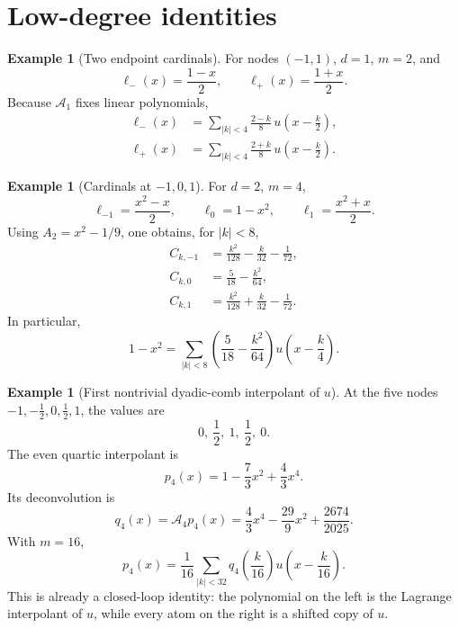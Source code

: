 \documentclass[11pt,oneside]{book}
\theoremstyle{definition}
\newtheorem{example}[theorem]{Example}
\theoremstyle{remark}
\newcommand{\Aop}{\mathcal A}
\begin{document}
\section{Low-degree identities}
\begin{example}[Two endpoint cardinals]
For nodes \((-1,1)\), \(d=1\), \(m=2\), and
\[
 \ell_-(x)=\frac{1-x}{2},\qquad \ell_+(x)=\frac{1+x}{2}.
\]
Because \(\Aop_1\) fixes linear polynomials,
\begin{align}
 \ell_-(x)&=\sum_{|k|<4}\frac{2-k}{8}\,u\!\left(x-\frac k2\right),\label{eq:linear-cardinal-minus}\\
 \ell_+(x)&=\sum_{|k|<4}\frac{2+k}{8}\,u\!\left(x-\frac k2\right).
 \label{eq:linear-cardinal-plus}
\end{align}
\end{example}

\begin{example}[Cardinals at \(-1,0,1\)]
For \(d=2\), \(m=4\),
\[
 \ell_{-1}=\frac{x^2-x}{2},\qquad
 \ell_0=1-x^2,\qquad
 \ell_1=\frac{x^2+x}{2}.
\]
Using \(A_2=x^2-1/9\), one obtains, for \(|k|<8\),
\begin{align}
 C_{k,-1}&=\frac{k^2}{128}-\frac{k}{32}-\frac1{72},\\
 C_{k,0}&=\frac5{18}-\frac{k^2}{64},\label{eq:quadratic-center-coeff}\\
 C_{k,1}&=\frac{k^2}{128}+\frac{k}{32}-\frac1{72}.
\end{align}
In particular,
\begin{equation}
 1-x^2=\sum_{|k|<8}
 \left(\frac5{18}-\frac{k^2}{64}\right)
 u\!\left(x-\frac k4\right).
 \label{eq:quadratic-up-identity}
\end{equation}
\end{example}

\begin{example}[First nontrivial dyadic-comb interpolant of \(u\)]
At the five nodes \(-1,-\tfrac12,0,\tfrac12,1\), the values are
\[
 0,\ \frac12,\ 1,\ \frac12,\ 0.
\]
The even quartic interpolant is
\begin{equation}
 p_4(x)=1-\frac73x^2+\frac43x^4.
 \label{eq:p4}
\end{equation}
Its deconvolution is
\begin{equation}
 q_4(x)=\Aop_4p_4(x)
 =\frac43x^4-\frac{29}{9}x^2+\frac{2674}{2025}.
 \label{eq:q4}
\end{equation}
With \(m=16\),
\begin{equation}
 p_4(x)=\frac1{16}\sum_{|k|<32}
 q_4\!\left(\frac{k}{16}\right)
 u\!\left(x-\frac{k}{16}\right).
 \label{eq:p4-self-representation}
\end{equation}
This is already a closed-loop identity: the polynomial on the left is the Lagrange interpolant of \(u\), while every atom on the right is a shifted copy of \(u\).
\end{example}
\end{document}
